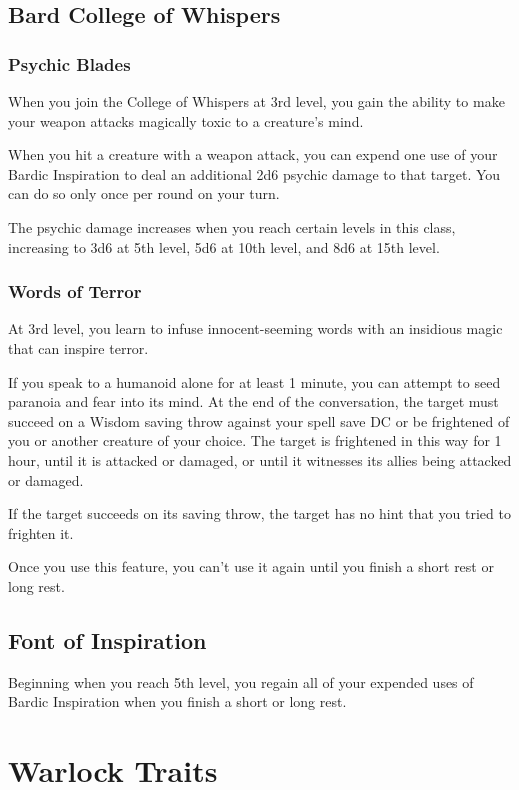 \documentclass[letterpaper,openany,oneside,twocolumn]{book}
\begin{document}
\subsection*{Bard College of Whispers}
\subsubsection*{Psychic Blades}
When you join the College of Whispers at 3rd level, you gain the ability to make your weapon attacks magically toxic to a creature's mind.

When you hit a creature with a weapon attack, you can expend one use of your Bardic Inspiration to deal an additional 2d6 psychic damage to that target. You can do so only once per round on your turn.

The psychic damage increases when you reach certain levels in this class, increasing to 3d6 at 5th level, 5d6 at 10th level, and 8d6 at 15th level.

\subsubsection*{Words of Terror}
At 3rd level, you learn to infuse innocent-seeming words with an insidious magic that can inspire terror.

If you speak to a humanoid alone for at least 1 minute, you can attempt to seed paranoia and fear into its mind. At the end of the conversation, the target must succeed on a Wisdom saving throw against your spell save DC or be frightened of you or another creature of your choice. The target is frightened in this way for 1 hour, until it is attacked or damaged, or until it witnesses its allies being attacked or damaged.

If the target succeeds on its saving throw, the target has no hint that you tried to frighten it.

Once you use this feature, you can't use it again until you finish a short rest or long rest.

\subsection*{Font of Inspiration}
Beginning when you reach 5th level, you regain all of your expended uses of Bardic Inspiration when you finish a short or long rest.

\section*{Warlock Traits}
\end{document}
